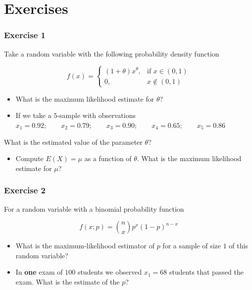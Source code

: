\documentclass[
]{book}
\providecommand{\tightlist}{%
  \setlength{\itemsep}{0pt}\setlength{\parskip}{0pt}}
\begin{document}
\hypertarget{exercises-10}{%
\section{Exercises}\label{exercises-10}}

\hypertarget{exercise-1-9}{%
\subsubsection{Exercise 1}\label{exercise-1-9}}

Take a random variable with the following probability density function

\[
f(x)=
\begin{cases}
    (1+\theta)x^\theta,& \text{if } x\in (0,1)\\
    0,&  x\notin (0,1)
\end{cases}
\]

\begin{itemize}
\item
  What is the maximum likelihood estimate for \(\theta\)?
\item
  If we take a \(5\)-sample with observations
  \(x_1 = 0.92; \qquad x_2 = 0.79; \qquad x_3 = 0.90; \qquad x_4 = 0.65; \qquad x_5 = 0.86\)
\end{itemize}

What is the estimated value of the parameter \(\theta\)?

\begin{itemize}
\tightlist
\item
  Compute \(E(X)=\mu\) as a function of \(\theta\). What is the maximum likelihood estimate for \(\mu\)?
\end{itemize}

\hypertarget{exercise-2-9}{%
\subsubsection{Exercise 2}\label{exercise-2-9}}

For a random variable with a binomial probability function

\[f(x; p)=\binom n x p^x(1-p)^{n-x}\]

\begin{itemize}
\item
  What is the maximum-likelihood estimator of \(p\) for a sample of size \(1\) of this random variable?
\item
  In \textbf{one} exam of \(100\) students we observed \(x_1=68\) students that passed the exam. What is the estimate of the \(p\)?
\end{itemize}
\end{document}
